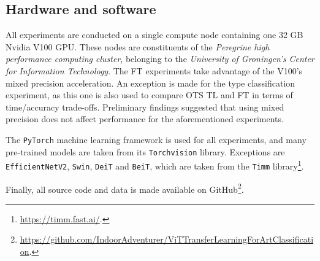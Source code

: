 \subsection{Hardware and software}
All experiments are conducted on a single compute node containing one 32 GB Nvidia V100 GPU. These nodes are constituents of the \textit{Peregrine high performance computing cluster}, belonging to the \textit{University of Groningen's Center for Information Technology}. The FT experiments take advantage of the V100's mixed precision acceleration. An exception is made for the type classification experiment, as this one is also used to compare OTS TL and FT in terms of time/accuracy trade-offs. Preliminary findings suggested that using mixed precision does not affect performance for the aforementioned experiments.

The \texttt{PyTorch} machine learning framework is used for all experiments, and many pre-trained models are taken from its \texttt{Torchvision} library. Exceptions are \texttt{EfficientNetV2}, \texttt{Swin}, \texttt{DeiT} and \texttt{BeiT}, which are taken from the \texttt{Timm} library\footnote{\url{https://timm.fast.ai/}.}.

Finally, all source code and data is made available on GitHub\footnote{\url{https://github.com/IndoorAdventurer/ViTTransferLearningForArtClassification}.}.

